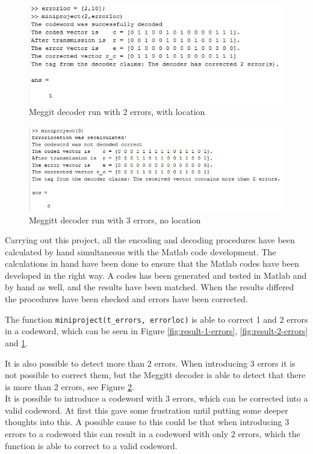 \documentclass[Main]{subfiles}
\begin{document}
\begin{figure}[h!]
\centering
\includegraphics[width=0.7\linewidth]{./Picture/result-2-errors-location}
\caption{Meggit decoder run with 2 errors, with location}
\label{fig:result-2-errors-location}
\end{figure}

\begin{figure}[h!]
\centering
\includegraphics[width=0.7\linewidth]{./Picture/result-3-errors}
\caption{Meggitt decoder run with 3 errors, no location}
\label{fig:result-3-errors}
\end{figure}

Carrying out this project, all the encoding and decoding procedures have been calculated by hand simultaneous with the Matlab code development.
The calculations in hand have been done to ensure that the Matlab codes have been developed in the right way.
A codes has been generated and tested in Matlab and by hand as well, and the results have been matched.
When the results differed the procedures have been checked and errors have been corrected.

The function \texttt{miniproject(t\_errors, errorloc)} is able to correct 1 and 2 errors in a codeword, which can be seen in Figure \ref{fig:result-1-errors}, \ref{fig:result-2-errors} and \ref{fig:result-2-errors-location}.

It is also possible to detect more than 2 errors.
When introducing 3 errors it is not possible to correct them, but the Meggitt decoder is able to detect that there is more than 2 errors, see Figure \ref{fig:result-3-errors}.\\

It is possible to introduce a codeword with 3 errors, which can be corrected into a valid codeword.
At first this gave some frustration until putting some deeper thoughts into this.
A possible cause to this could be that when introducing 3 errors to a codeword this can result in a codeword with only 2 errors, which the function is able to correct to a valid codeword.
\end{document}
